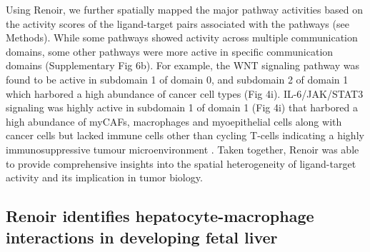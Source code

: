 Using Renoir, we further spatially mapped the major pathway activities based on the activity scores of the ligand-target pairs associated with the pathways (see Methods). While some pathways showed activity across multiple communication domains, some other pathways were more active in specific communication domains (Supplementary Fig 6b). For example, the WNT signaling pathway was found to be active in subdomain 1 of domain 0, and subdomain 2 of domain 1 which harbored a high abundance of cancer cell types (Fig 4i). IL-6/JAK/STAT3 signaling was highly active in subdomain 1 of domain 1 (Fig 4i) that harbored a high abundance of myCAFs, macrophages and myoepithelial cells along with cancer cells but lacked immune cells other than cycling T-cells indicating a highly immunosuppressive tumour microenvironment \citep{Johnson2018}. Taken together, Renoir was able to provide comprehensive insights into the spatial heterogeneity of ligand-target activity and its implication in tumor biology.


\subsection*{Renoir identifies hepatocyte-macrophage interactions in developing fetal liver}

